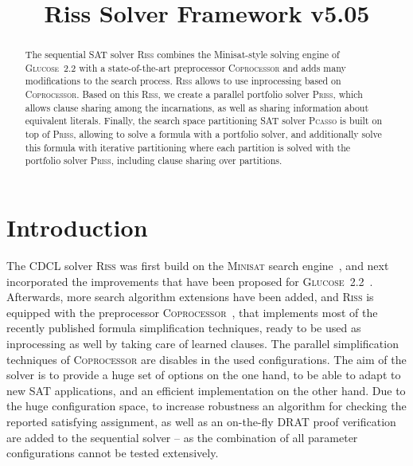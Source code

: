 \documentclass[conference]{IEEEtran}
\begin{document}
	
\title{Riss Solver Framework v5.05}

\author{
}

\maketitle

\def\coprocessor{\textsc{Coprocessor}\xspace}
\def\glucose{\textsc{Glucose~2.2}\xspace}
\def\minisat{\textsc{Minisat~2.2}\xspace}
\def\riss{\textsc{Riss}\xspace}
\def\priss{\textsc{Priss}\xspace}
\def\pcasso{\textsc{Pcasso}\xspace}

\begin{abstract}
The sequential SAT solver \riss combines the Minisat-style solving engine of \glucose with a state-of-the-art preprocessor \textsc{Coprocessor} and adds many modifications to the search process. 
\riss allows to use inprocessing based on \coprocessor.
Based on this \riss, we create a parallel portfolio solver \priss, which allows clause sharing among the incarnations, as well as sharing information about equivalent literals. 
Finally, the search space partitioning SAT solver \pcasso is built on top of \priss, allowing to solve a formula with a portfolio solver, and additionally solve this formula with iterative partitioning where each partition is solved with the portfolio solver \priss, including clause sharing over partitions. 
\end{abstract}

\section{Introduction}

The CDCL solver \riss was first build on the \textsc{Minisat} search engine~\cite{EenS:2003}, and next incorporated the improvements that have been proposed for \glucose ~\cite{AudemardS:2009,Audemard:2012:RRS:2405292.2405308}. 
Afterwards, more search algorithm extensions have been added, and \riss is equipped with the preprocessor \textsc{Coprocessor}~\cite{Manthey:2012}, 
that implements most of the recently published formula simplification techniques, ready to be used as inprocessing as well by taking care of learned clauses. 
The parallel simplification techniques of \coprocessor are disables in the used configurations. 
The aim of the solver is to provide a huge set of options on the one hand, to be able to adapt to new SAT applications, and an efficient implementation on the other hand. 
Due to the huge configuration space, to increase robustness an algorithm for checking the reported satisfying assignment, as well as an on-the-fly DRAT proof verification are added to the sequential solver -- as the combination of all parameter configurations cannot be tested extensively. 
\end{document}

